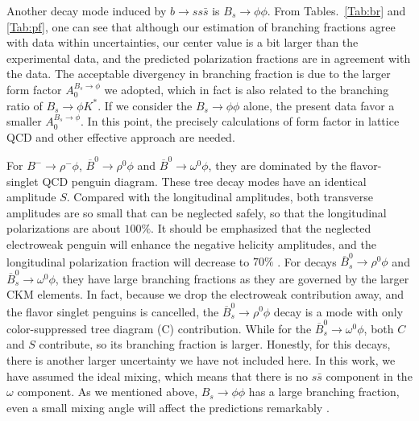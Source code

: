 \documentclass[11pt]{article}
\begin{document}
Another decay mode induced by $b\to ss\bar s$ is $B_s \to \phi\phi$. From Tables.~\ref{Tab:br} and \ref{Tab:pf}, one can see that although our estimation of branching fractions agree with data within uncertainties, our center value is a bit larger than the experimental data, and the predicted polarization fractions are in agreement with the data. The acceptable divergency in branching fraction is due to the larger form factor $A_0^{B_s \to \phi}$ we adopted, which in fact is also related to the branching ratio of $B_s \to \phi K^*$.  If we consider the $B_s \to \phi \phi$ alone,  the present data favor a smaller $A_0^{B_s \to \phi}$. In this point, the precisely calculations of form factor in lattice QCD and other effective approach are needed.

For $B^- \to \rho^-\phi$, $\overline B^0 \to \rho^0\phi$ and $\overline B^0 \to \omega^0\phi$, they are dominated by the flavor-singlet QCD penguin diagram. These tree decay modes have an identical amplitude $S$. Compared with the longitudinal amplitudes,  both transverse amplitudes are so small that can be neglected safely, so that the longitudinal polarizations are about $100\%$. It should be emphasized that the neglected electroweak penguin will enhance the negative helicity amplitudes, and the longitudinal polarization fraction will decrease to $70\%$ \cite{Beneke:2005we}. For decays $\overline B_s^0 \to \rho^0\phi$ and $\overline B_s^0 \to \omega^0\phi$, they have large branching fractions as they are governed by the larger CKM elements. In fact, because we drop the electroweak contribution away, and %
the flavor singlet penguins is cancelled,  the $\overline B_s^0 \to \rho^0\phi$ decay is a mode with only  color-suppressed tree diagram (C) contribution. While for the $\overline B_s^0 \to \omega^0\phi$, both $C$ and $S$ contribute, so its branching fraction is larger. Honestly, for this decays, there is another larger uncertainty we have not included here. In this work, we have assumed the ideal mixing, which means that there is no $s\bar s$ component in the $\omega$ component. As we mentioned above, $B_s\to \phi\phi$ has a large branching fraction, even a small mixing angle will affect the predictions remarkably \cite{Li:piphi}.
\end{document}
